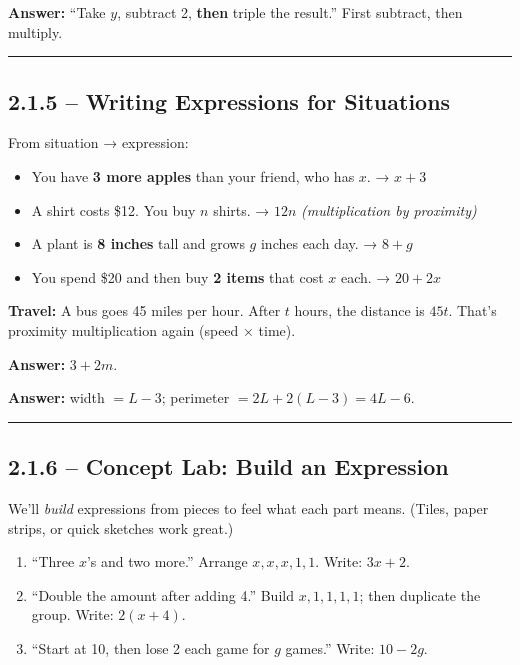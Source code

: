 \documentclass[
  letterpaper,
  DIV=11,
  numbers=noendperiod]{scrreprt}
\providecommand{\tightlist}{%
  \setlength{\itemsep}{0pt}\setlength{\parskip}{0pt}}
\begin{document}
\textbf{Answer:} ``Take \(y\), subtract 2, \textbf{then} triple the
result.'' First subtract, then multiply.

\begin{center}\rule{0.5\linewidth}{0.5pt}\end{center}

\subsection*{2.1.5 -- Writing Expressions for
Situations}\label{writing-expressions-for-situations}

From situation → expression:

\begin{itemize}
\tightlist
\item
  You have \textbf{3 more apples} than your friend, who has \(x\). →
  \(x + 3\)
\item
  A shirt costs \$12. You buy \(n\) shirts. → \(12n\)
  \emph{(multiplication by proximity)}
\item
  A plant is \textbf{8 inches} tall and grows \(g\) inches each day. →
  \(8 + g\)
\item
  You spend \$20 and then buy \textbf{2 items} that cost \(x\) each. →
  \(20 + 2x\)
\end{itemize}

\textbf{Travel:} A bus goes 45 miles per hour. After \(t\) hours, the
distance is \(45t\). That's proximity multiplication again (speed ×
time).

\textbf{Answer:} \(3 + 2m\).

\textbf{Answer:} width \(= L - 3\); perimeter
\(= 2L + 2(L - 3) = 4L - 6\).

\begin{center}\rule{0.5\linewidth}{0.5pt}\end{center}

\subsection*{2.1.6 -- Concept Lab: Build an
Expression}\label{concept-lab-build-an-expression}

We'll \emph{build} expressions from pieces to feel what each part means.
(Tiles, paper strips, or quick sketches work great.)

\begin{enumerate}
\def\labelenumi{\arabic{enumi}.}
\tightlist
\item
  ``Three \(x\)'s and two more.'' Arrange \textbf{\(x, x, x, 1, 1\)}.
  Write: \(3x + 2\).
\item
  ``Double the amount after adding 4.'' Build
  \textbf{\(x, 1, 1, 1, 1\)}; then duplicate the group. Write:
  \(2(x+4)\).
\item
  ``Start at 10, then lose 2 each game for \(g\) games.'' Write:
  \(10 - 2g\).
\end{enumerate}
\end{document}

